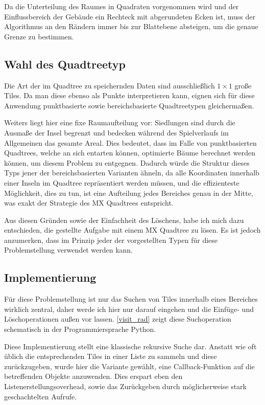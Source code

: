 \documentclass[%
			paper=a4,%
			DIV12,
			liststotoc,
			bibtotoc,
			draft=false,%
			titlepage,
			numbers=noendperiod
			]{scrartcl}
\begin{document}
Da die Unterteilung des Raumes in Quadraten vorgenommen wird und der Einflussbereich der Gebäude ein Rechteck mit abgerundeten Ecken ist, 
muss der Algorithmus an den Rändern immer bis zur Blattebene absteigen, um die genaue Grenze zu bestimmen.

\subsection{Wahl des Quadtreetyp}

Die Art der im Quadtree zu speichernden Daten sind ausschließlich $1\times1$ große Tiles. Da man diese ebenso als Punkte interpretieren kann, eignen sich für diese Anwendung punktbasierte sowie bereichsbasierte Quadtreetypen gleichermaßen.

Weiters liegt hier eine fixe Raumaufteilung vor:
Siedlungen sind durch die Ausmaße der Insel begrenzt und bedecken während des Spielverlaufs im Allgemeinen das gesamte Areal.
Dies bedeutet, dass im Falle von punktbasierten Quadtrees, welche an sich entarten können, optimierte Bäume berechnet werden können, um diesem Problem zu entgegnen.
Dadurch würde die Struktur dieses Typs jener der bereichsbasierten Varianten ähneln, da alle Koordinaten innerhalb einer Inseln im Quadtree repräsentiert werden müssen, und die effizienteste Möglichkeit, dies zu tun, ist eine Aufteilung jedes Bereiches genau in der Mitte, was exakt der Strategie des MX Quadtrees entspricht.

Aus diesen Gründen sowie der Einfachheit des Löschens, habe ich mich dazu entschieden, die gestellte Aufgabe mit einem MX Quadtree zu lösen.
Es ist jedoch anzumerken, dass im Prinzip jeder der vorgestellten Typen für diese Problemstellung verwendet werden kann.

\subsection{Implementierung}

Für diese Problemstellung ist nur das Suchen von Tiles innerhalb eines Bereiches wirklich zentral, daher werde ich hier nur darauf eingehen und die Einfüge- und Löschoperationen außen vor lassen.
\lstlistingname{} \ref{visit_rad} zeigt diese Suchoperation schematisch in der Programmiersprache Python.

Diese Implementierung stellt eine klassische rekursive Suche dar. 
Anstatt wie oft üblich die entsprechenden Tiles in einer Liste zu sammeln und diese zurückzugeben, wurde hier die Variante gewählt, eine Callback-Funktion auf die betreffenden Objekte anzuwenden. Dies erspart eben den Listenerstellungsoverhead, sowie das Zurückgeben durch möglicherweise stark geschachtelten Aufrufe.
\end{document}
